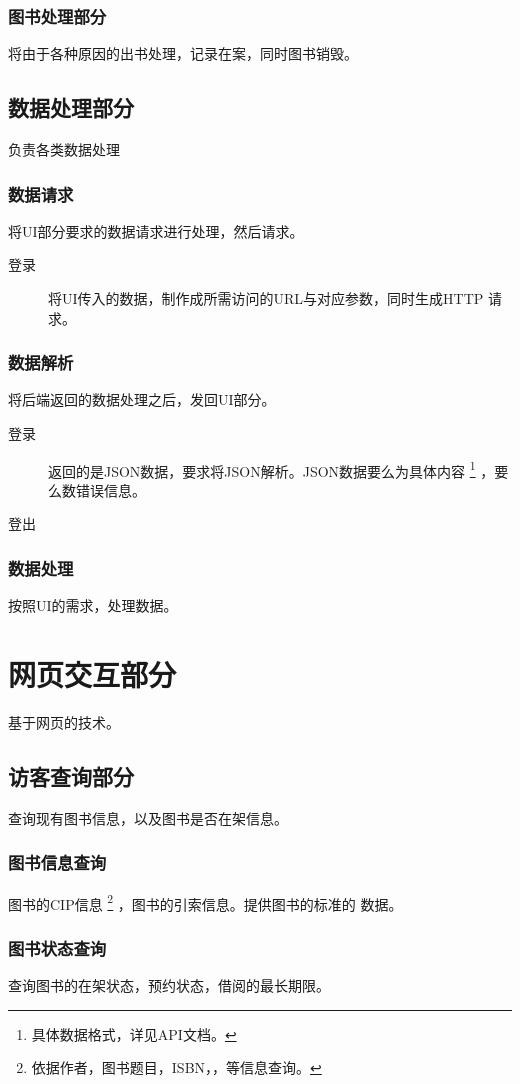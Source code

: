 \documentclass[UTF8]{report}
\begin{document}
    \subsection{图书处理部分}
    将由于各种原因的出书处理，记录在案，同时图书销毁。
    \section{数据处理部分}
    负责各类数据处理
    \subsection{数据请求}
    将UI部分要求的数据请求进行处理，然后请求。
	\begin{description}
	\item[登录] 将UI传入的数据，制作成所需访问的URL与对应参数，同时生成HTTP
		请求。
	\end{description}
    \subsection{数据解析}
    将后端返回的数据处理之后，发回UI部分。
	\begin{description}
	\item[登录] 返回的是JSON数据，要求将JSON解析。JSON数据要么为具体内容
		\footnote{具体数据格式，详见API文档。}
		，要么数错误信息。
	\item[登出]
	\end{description}
    \subsection{数据处理}
    按照UI的需求，处理数据。
    \chapter{网页交互部分}
    基于网页的技术。
    \section{访客查询部分}
    查询现有图书信息，以及图书是否在架信息。
    \subsection{图书信息查询}
    图书的CIP信息
    \footnote{依据作者，图书题目，ISBN，，等信息查询。}
    ，图书的引索信息。提供图书的标准的 \BibTeX 数据。
    \subsection{图书状态查询}
    查询图书的在架状态，预约状态，借阅的最长期限。
\end{document}
